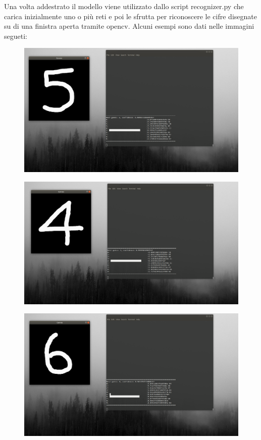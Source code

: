 \documentclass[12pt]{article}
\begin{document}
Una volta addestrato il modello viene utilizzato dallo script recognizer.py
che carica inizialmente uno o più reti e poi le sfrutta per riconoscere le cifre disegnate su 
di una finistra aperta tramite opencv\cite{opencv}.
Alcuni esempi sono dati nelle immagini segueti:


\begin{figure}[H]{}
    \centering
    \includegraphics[scale=0.25]{../images/1.png}
\end{figure}

\begin{figure}[H]{}
    \centering
    \includegraphics[scale=0.25]{../images/2.png}
\end{figure}

\begin{figure}[H]{}
    \centering
    \includegraphics[scale=0.25]{../images/3.png}
\end{figure}
\end{document}
